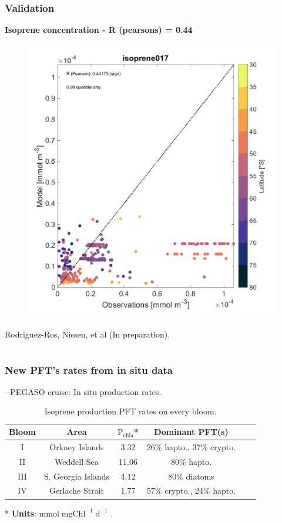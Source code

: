 \documentclass{beamer}
\begin{document}
\begin{frame}
\frametitle{Validation}
\textbf{Isoprene concentration - R (pearsons) = 0.44}

\begin{figure}
\includegraphics[width=0.50\linewidth]{isoprene_observations_vs_modelo_017_3080_2_Lat_099_PAPER.png}
\end{figure}
\tiny  Rodriguez-Ros, Nissen, et al (In preparation).
\end{frame}

\section{}

\begin{frame}
\frametitle{New PFT's rates from in situ data}
- PEGASO cruise: In situ production rates.
\begin{center}

\bigskip

\end{center}
\begin{center}
\begin{table}[b!]
\caption{Isoprene production PFT rates on every bloom.}
\centering
\begin{tabular}[ht]{ c|c|c|c|c|c } 

 \textbf{Bloom} & \textbf{Area} & \textbf{ $\mathrm{P_{chla}}$* }& \textbf{Dominant PFT(s)} \\\hline
 I &  Orkney Islands & 3.32   & 26\% hapto., 37\% crypto.  \\
II &   Weddell Sea&  11.06   &  80\% hapto.\\
 III &  S. Georgia Islands & 4.12 & 80\% diatoms  \\
 IV & Gerlache Strait & 1.77  &  57\% crypto., 24\% hapto.\\
\end{tabular}
\end{table}
\bigskip
* \textbf{Units}:  $\mathrm{mmol} \; \mathrm{mgChl}^{\mathrm{-1}} \; \mathrm{d}^{\mathrm{-1}}$  .
\end{center}
\end{frame}
\end{document}
